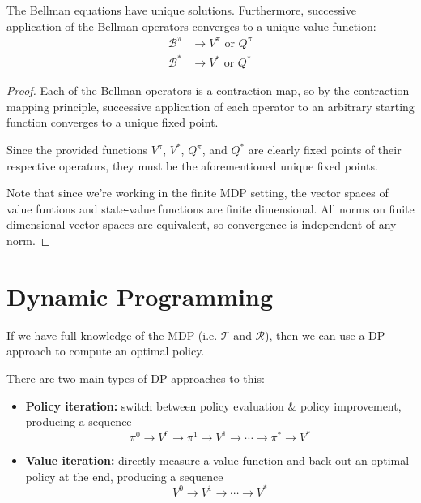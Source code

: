 \documentclass[twoside,10pt]{report}
\begin{document}
\begin{cor}
	\label{bellmanoperators}
	The Bellman equations have unique solutions. Furthermore, successive application of the Bellman operators converges to a unique value function:
\begin{align*}
	\mathcal{B}^{\pi} &\to V^{\pi} \text{ or } Q^{\pi} \\
	\mathcal{B}^{*} &\to V^{*} \text{ or } Q^{*}
\end{align*}
\end{cor}
\begin{proof}
	Each of the Bellman operators is a contraction map, so by the contraction mapping principle, successive application of each operator to an arbitrary starting function converges to a unique fixed point.

	Since the provided functions $V^{\pi}$, $V^{*}$, $Q^{\pi}$, and $Q^{*}$ are clearly fixed points of their respective operators, they must be the aforementioned unique fixed points.

	Note that since we're working in the finite MDP setting, the vector spaces of value funtions and state-value functions are finite dimensional. All norms on finite dimensional vector spaces are equivalent, so convergence is independent of any norm.
\end{proof}


\section{Dynamic Programming}

If we have full knowledge of the MDP (i.e. $\mathcal{T}$ and $\mathcal{R}$), then we can use a DP approach to compute an optimal policy.

There are two main types of DP approaches to this:
\begin{itemize}
	\item \textbf{Policy iteration:} switch between policy evaluation \& policy improvement, producing a sequence
		\[
		\pi^{0} \to V^{0} \to \pi^{1}\to V^1 \to \cdots \to \pi^{*} \to V^{*}
		\] 
	\item \textbf{Value iteration:} directly measure a value function and back out an optimal policy at the end, producing a sequence
		\[
		V^{0} \to V^1 \to \cdots \to V^{*}
		\] 
\end{itemize}
\end{document}
